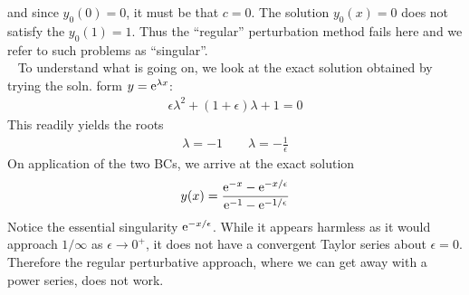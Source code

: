 and since $y_0(0)=0$, it must be that $c=0$. The solution $y_0(x)=0$ does not satisfy the $y_0(1)=1$. Thus the ``regular'' perturbation method fails here and we refer to such problems as ``singular''. \\
\ \newline 
To understand what is going on, we look at the exact solution obtained by trying the soln. form $y = \mathrm{e}^{\lambda x}$:
\begin{gather*}
	\epsilon \lambda^2 + (1+\epsilon) \lambda + 1 = 0
\end{gather*}
This readily yields the roots
\begin{gather*}
	\lambda = -1  \qquad \lambda= -\frac{1}{\epsilon}
\end{gather*}
On application of the two BCs, we arrive at the exact solution
\begin{gather}\label{eqn:wk12-ex1-exact}
	y(x) = \frac{\mathrm{e}^{-x} - \mathrm{e}^{-x/\epsilon}}{\mathrm{e}^{-1} - \mathrm{e}^{-1/\epsilon}}
\end{gather}
Notice the essential singularity $\mathrm{e}^{-x/\epsilon}$. While it appears harmless as it would approach $1/\infty$ as $\epsilon \rightarrow 0^+$, it does not have a convergent Taylor series about $\epsilon = 0$. Therefore the regular perturbative approach, where we can get away with a power series, does not work. 

